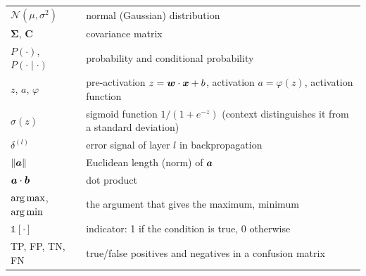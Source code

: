 \begin{longtable}{@{}p{2.6cm}p{11.4cm}@{}}
$\mathcal N(\mu,\sigma^2)$ & normal (Gaussian) distribution\\
$\mathbf\Sigma$, $\mathbf C$ & covariance matrix\\
$P(\cdot)$, $P(\cdot\mid\cdot)$ & probability and conditional probability\\
$z$, $a$, $\varphi$ & pre-activation $z=\boldsymbol{w}\cdot\boldsymbol{x}+b$, activation $a=\varphi(z)$, activation function\\
$\sigma(z)$ & sigmoid function $1/(1+e^{-z})$ (context distinguishes it from a standard deviation)\\
$\delta^{(l)}$ & error signal of layer $l$ in backpropagation\\
$\|\boldsymbol{a}\|$ & Euclidean length (norm) of $\boldsymbol{a}$\\
$\boldsymbol{a}\cdot\boldsymbol{b}$ & dot product\\
$\operatorname*{arg\,max}$, $\operatorname*{arg\,min}$ & the argument that gives the maximum, minimum\\
$\mathbb 1[\cdot]$ & indicator: 1 if the condition is true, 0 otherwise\\
TP, FP, TN, FN & true/false positives and negatives in a confusion matrix\\
\bottomrule
\end{longtable}
